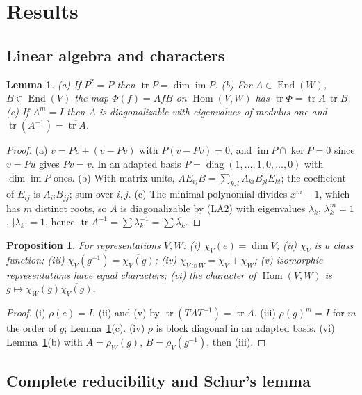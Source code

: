 \documentclass[11pt]{article}
\newtheorem{proposition}[theorem]{Proposition}
\newtheorem{lemma}[theorem]{Lemma}
\theoremstyle{definition}
\theoremstyle{remark}
\newcommand{\claim}[1]{\leavevmode\marginpar{\raggedright\scriptsize\texttt{#1}}}
\newcommand{\Hom}{\operatorname{Hom}}
\newcommand{\tr}{\operatorname{tr}}
\begin{document}
\section{Results}
\subsection{Linear algebra and characters}

\begin{lemma}\label{lem:la}\claim{L-1}
(a) If $P^2=P$ then $\tr P=\dim\operatorname{im}P$.
(b) For $A\in\operatorname{End}(W)$, $B\in\operatorname{End}(V)$ the map $\Phi(f)=AfB$ on $\Hom(V,W)$ has $\tr\Phi=\tr A\,\tr B$.
(c) If $A^m=I$ then $A$ is diagonalizable with eigenvalues of modulus one and $\tr(A^{-1})=\overline{\tr A}$.
\end{lemma}
\begin{proof}
(a) $v=Pv+(v-Pv)$ with $P(v-Pv)=0$, and $\operatorname{im}P\cap\ker P=0$ since $v=Pu$ gives $Pv=v$. In an adapted basis
$P=\operatorname{diag}(1,\dots,1,0,\dots,0)$ with $\dim\operatorname{im}P$ ones.
(b) With matrix units, $AE_{ij}B=\sum_{k,l}A_{ki}B_{jl}E_{kl}$; the coefficient of $E_{ij}$ is $A_{ii}B_{jj}$; sum over $i,j$.
(c) The minimal polynomial divides $x^m-1$, which has $m$ distinct roots, so $A$ is diagonalizable by (LA2) with
eigenvalues $\lambda_k$, $\lambda_k^m=1$, $|\lambda_k|=1$, hence $\tr A^{-1}=\sum\lambda_k^{-1}=\sum\overline{\lambda_k}$.
\end{proof}

\begin{proposition}\label{prop:char}\claim{P-1}
For representations $V,W$: (i) $\chi_V(e)=\dim V$; (ii) $\chi_V$ is a class function; (iii) $\chi_V(g^{-1})=\overline{\chi_V(g)}$;
(iv) $\chi_{V\oplus W}=\chi_V+\chi_W$; (v) isomorphic representations have equal characters; (vi) the character of
$\Hom(V,W)$ is $g\mapsto\chi_W(g)\overline{\chi_V(g)}$.
\end{proposition}
\begin{proof}
(i) $\rho(e)=I$. (ii) and (v) by $\tr(TAT^{-1})=\tr A$. (iii) $\rho(g)^m=I$ for $m$ the order of $g$; Lemma~\ref{lem:la}(c).
(iv) $\rho$ is block diagonal in an adapted basis. (vi) Lemma~\ref{lem:la}(b) with $A=\rho_W(g)$, $B=\rho_V(g^{-1})$, then (iii).
\end{proof}

\subsection{Complete reducibility and Schur's lemma}
\end{document}
